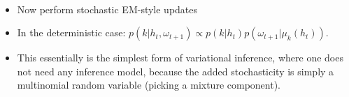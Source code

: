 \documentclass{article}
\begin{document}
\begin{enumerate}
\begin{align}
\end{align}
\begin{itemize}
\item Now perform stochastic EM-style updates
\item In the deterministic case: $p(k | h_t, \omega_{t+1}) \propto   p(k|h_t) p(\omega_{t+1} \vert \mu_k(h_t))$.
\item This essentially is the simplest form of variational inference, where one does not need any inference model, because the added stochasticity is simply a multinomial random variable (picking a mixture component). 
\end{itemize}
\end{enumerate}



\end{document}
